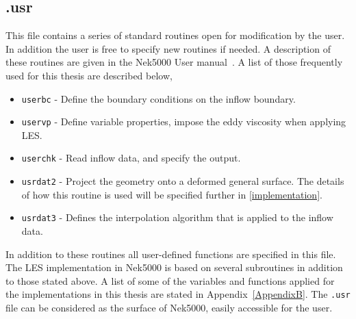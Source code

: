 \subsection{.usr}
This file contains a series of standard routines open for modification by the user. In addition the user is free to specify 
new routines if needed. A description of these routines are given in the Nek5000 User manual~\cite{Nek}. A list of those 
frequently used for this thesis are described below, 
%
%
\begin{itemize}
    \item \verb|userbc| - Define the boundary conditions on the inflow boundary. 
    \item \verb|uservp| - Define variable properties, impose the eddy viscosity when applying LES. 
    \item \verb|userchk| - Read inflow data, and specify the output.
    \item \verb|usrdat2| - Project the geometry onto a deformed general surface. The details of how this routine is used will be 
    specified further in \cref{implementation}. 
    \item \verb|usrdat3| - Defines the interpolation algorithm that is applied to the inflow data. 
\end{itemize}
%
In addition to these routines all user-defined functions are specified in this file. The LES implementation in Nek5000 is based
on several subroutines in addition to those stated above. A list of some of the variables and functions 
applied for the implementations in this thesis are stated in Appendix~\ref{AppendixB}.
The \verb|.usr| file can be considered as the surface of Nek5000, easily accessible for the user.


